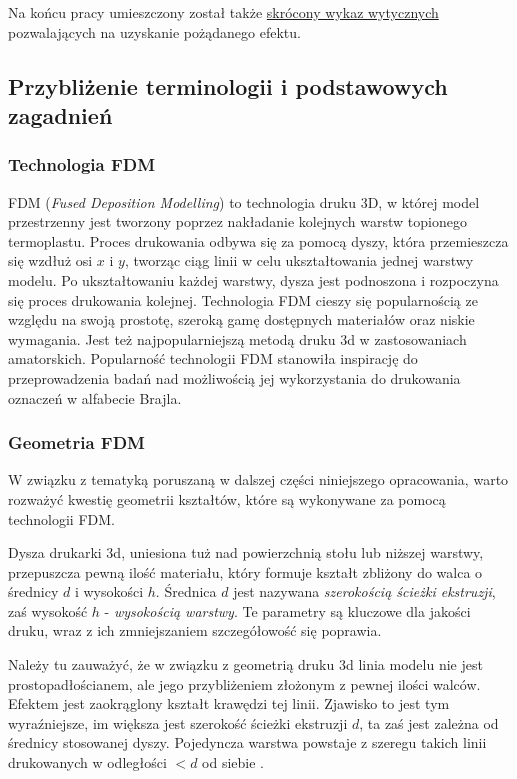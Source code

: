 \documentclass[12pt,a4paper]{article}
\begin{document}
Na końcu pracy umieszczony został także \hyperref[sec:recommendations]{skrócony wykaz wytycznych} pozwalających na uzyskanie pożądanego efektu.

\subsection{Przybliżenie terminologii i podstawowych zagadnień}
\subsubsection{Technologia FDM}
FDM (\emph{Fused Deposition Modelling}) to technologia druku 3D, w której model przestrzenny jest tworzony poprzez nakładanie kolejnych warstw topionego termoplastu. Proces drukowania odbywa się za pomocą dyszy, która przemieszcza się wzdłuż osi $x$ i $y$, tworząc ciąg linii w celu ukształtowania jednej warstwy modelu. Po ukształtowaniu każdej warstwy, dysza jest podnoszona i rozpoczyna się proces drukowania kolejnej. Technologia FDM cieszy się popularnością ze względu na swoją prostotę, szeroką gamę dostępnych materiałów oraz niskie wymagania. Jest też najpopularniejszą metodą druku 3d w zastosowaniach amatorskich.
Popularność technologii FDM stanowiła inspirację do przeprowadzenia badań nad możliwością jej wykorzystania do drukowania oznaczeń w alfabecie Brajla.

\subsubsection{Geometria FDM}
W związku z tematyką poruszaną w dalszej części niniejszego opracowania, warto rozważyć kwestię geometrii kształtów, które są wykonywane za pomocą technologii FDM.

Dysza drukarki 3d, uniesiona tuż nad powierzchnią stołu lub niższej warstwy, przepuszcza pewną ilość materiału, który formuje kształt zbliżony do walca o średnicy $d$ i wysokości $h$.
Średnica $d$ jest nazywana \emph{szerokością ścieżki ekstruzji}, zaś wysokość $h$ - \emph{wysokością warstwy}. Te parametry są kluczowe dla jakości druku, wraz z ich zmniejszaniem szczegółowość się poprawia.

Należy tu zauważyć, że w związku z geometrią druku 3d linia modelu nie jest prostopadłościanem, ale jego przybliżeniem złożonym z pewnej ilości walców. Efektem jest zaokrąglony kształt krawędzi tej linii. Zjawisko to jest tym wyraźniejsze, im większa jest szerokość ścieżki ekstruzji $d$, ta zaś jest zależna od średnicy stosowanej dyszy.
Pojedyncza warstwa powstaje z szeregu takich linii drukowanych w odległości $<d$ od siebie \cite{slicmath}.
\end{document}
